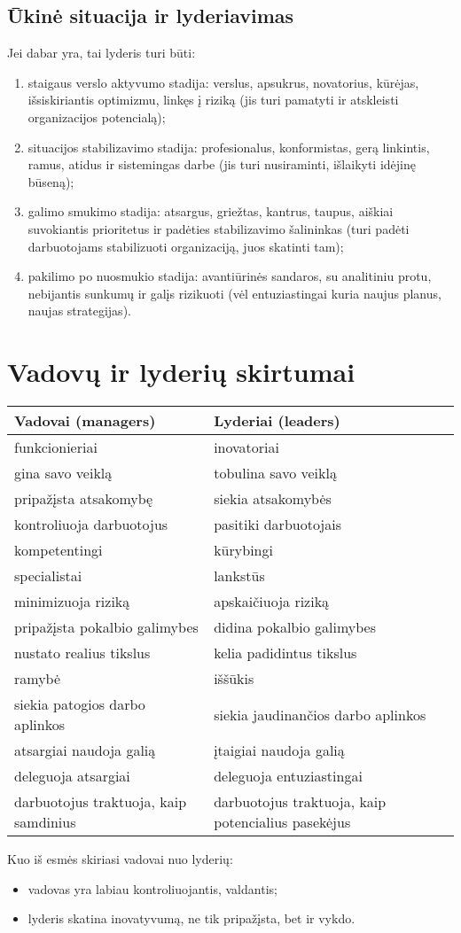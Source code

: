 \subsection{Ūkinė situacija ir lyderiavimas}

Jei dabar yra, tai lyderis turi būti:
\begin{enumerate}
  \item staigaus verslo aktyvumo stadija: verslus, apsukrus, novatorius,
    kūrėjas, išsiskiriantis optimizmu, linkęs į riziką (jis turi pamatyti
    ir atskleisti organizacijos potencialą);
  \item situacijos stabilizavimo stadija: profesionalus, konformistas,
    gerą linkintis, ramus, atidus ir sistemingas darbe (jis turi 
    nusiraminti, išlaikyti idėjinę būseną);
  \item galimo smukimo stadija: atsargus, griežtas, kantrus, taupus,
    aiškiai suvokiantis prioritetus ir padėties stabilizavimo šalininkas
    (turi padėti darbuotojams stabilizuoti organizaciją, juos skatinti
    tam);
  \item pakilimo po nuosmukio stadija: avantiūrinės sandaros, su
    analitiniu protu, nebijantis sunkumų ir galįs rizikuoti
    (vėl entuziastingai kuria naujus planus, naujas strategijas).
\end{enumerate}

\section{Vadovų ir lyderių skirtumai}

\begin{tabularx}{\textwidth}[]{X | X}
  Vadovai (managers) & Lyderiai (leaders) \\
  \hline
  funkcionieriai & inovatoriai \\
  gina savo veiklą & tobulina savo veiklą \\
  pripažįsta atsakomybę & siekia atsakomybės \\
  kontroliuoja darbuotojus & pasitiki darbuotojais \\
  kompetentingi & kūrybingi \\
  specialistai & lankstūs \\
  minimizuoja riziką & apskaičiuoja riziką \\
  pripažįsta pokalbio galimybes & didina pokalbio galimybes \\
  nustato realius tikslus & kelia padidintus tikslus \\
  ramybė & iššūkis \\
  siekia patogios darbo aplinkos & siekia jaudinančios darbo aplinkos \\
  atsargiai naudoja galią & įtaigiai naudoja galią \\
  deleguoja atsargiai & deleguoja entuziastingai \\
  darbuotojus traktuoja, kaip samdinius & darbuotojus traktuoja, kaip
  potencialius pasekėjus
\end{tabularx}

Kuo iš esmės skiriasi vadovai nuo lyderių:
\begin{itemize}
  \item vadovas yra labiau kontroliuojantis, valdantis;
  \item lyderis skatina inovatyvumą, ne tik pripažįsta, bet ir vykdo.
\end{itemize}
